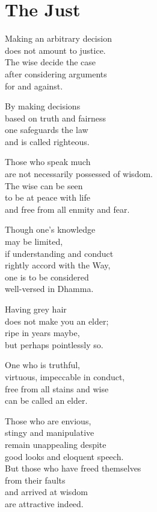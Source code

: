 
\chapter{The Just}


Making an arbitrary decision\\
does not amount to justice.\\
The wise decide the case\\
after considering arguments\\
for and against.


By making decisions\\
based on truth and fairness\\
one safeguards the law\\
and is called righteous.


Those who speak much\\
are not necessarily possessed of wisdom.\\
The wise can be seen\\
to be at peace with life\\
and free from all enmity and fear.


Though one's knowledge\\
may be limited,\\
if understanding and conduct\\
rightly accord with the Way,\\
one is to be considered\\
well-versed in Dhamma.


Having grey hair\\
does not make you an elder;\\
ripe in years maybe,\\
but perhaps pointlessly so.


One who is truthful,\\
virtuous, impeccable in conduct,\\
free from all stains and wise\\
can be called an elder.


Those who are envious,\\
stingy and manipulative\\
remain unappealing despite\\
good looks and eloquent speech.\\
But those who have freed themselves\\
from their faults\\
and arrived at wisdom\\
are attractive indeed.


